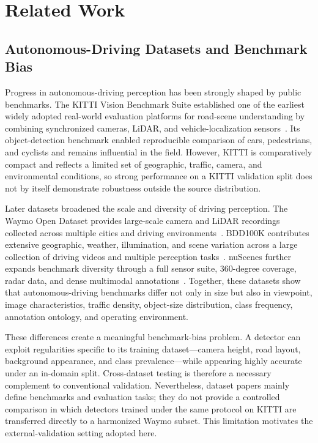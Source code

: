 \section{Related Work}
\label{sec:related_work}

\subsection{Autonomous-Driving Datasets and Benchmark Bias}
\label{sec:related_datasets}

Progress in autonomous-driving perception has been strongly shaped by public benchmarks.
The KITTI Vision Benchmark Suite established one of the earliest widely adopted
real-world evaluation platforms for road-scene understanding by combining synchronized
cameras, LiDAR, and vehicle-localization sensors~\cite{geiger2012kitti}. Its
object-detection benchmark enabled reproducible comparison of cars, pedestrians, and
cyclists and remains influential in the field. However, KITTI is comparatively compact
and reflects a limited set of geographic, traffic, camera, and environmental conditions,
so strong performance on a KITTI validation split does not by itself demonstrate
robustness outside the source distribution.

Later datasets broadened the scale and diversity of driving perception. The Waymo Open
Dataset provides large-scale camera and LiDAR recordings collected across multiple cities
and driving environments~\cite{sun2020waymo}. BDD100K contributes extensive geographic,
weather, illumination, and scene variation across a large collection of driving videos and
multiple perception tasks~\cite{yu2020bdd100k}. nuScenes further expands benchmark
diversity through a full sensor suite, 360-degree coverage, radar data, and dense
multimodal annotations~\cite{caesar2020nuscenes}. Together, these datasets show that
autonomous-driving benchmarks differ not only in size but also in viewpoint, image
characteristics, traffic density, object-size distribution, class frequency, annotation
ontology, and operating environment.

These differences create a meaningful benchmark-bias problem. A detector can exploit
regularities specific to its training dataset---camera height, road layout, background
appearance, and class prevalence---while appearing highly accurate under an in-domain
split. Cross-dataset testing is therefore a necessary complement to conventional
validation. Nevertheless, dataset papers mainly define benchmarks and evaluation tasks;
they do not provide a controlled comparison in which detectors trained under the same
protocol on KITTI are transferred directly to a harmonized Waymo subset. This limitation
motivates the external-validation setting adopted here.

